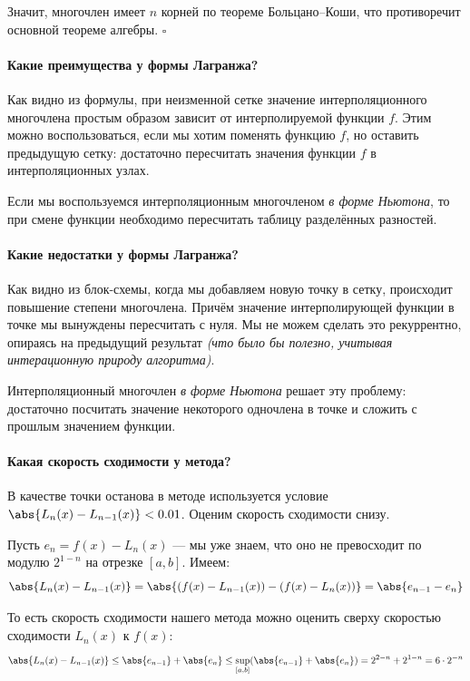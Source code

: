 Значит, многочлен имеет \( n \) корней по теореме Больцано--Коши, что противоречит основной теореме алгебры. \( \square \)

\paragraph{Какие преимущества у формы Лагранжа?}

Как видно из формулы, при неизменной сетке значение интерполяционного многочлена простым образом зависит от интерполируемой функции \( f \). Этим можно воспользоваться, если мы хотим поменять функцию \( f \), но оставить предыдущую сетку: достаточно пересчитать значения функции \( f \) в интерполяционных узлах.

Если мы воспользуемся интерполяционным многочленом \textit{в форме Ньютона}, то при смене функции необходимо пересчитать таблицу разделённых разностей.

\paragraph{Какие недостатки у формы Лагранжа?}

Как видно из блок-схемы, когда мы добавляем новую точку в сетку, происходит повышение степени многочлена. Причём значение интерполирующей функции в точке мы вынуждены пересчитать с нуля. Мы не можем сделать это рекуррентно, опираясь на предыдущий результат \textit{(что было бы полезно, учитывая интерационную природу алгоритма)}. 

Интерполяционный многочлен \textit{в форме Ньютона} решает эту проблему: достаточно посчитать значение некоторого одночлена в точке и сложить с прошлым значением функции.

\paragraph{Какая скорость сходимости у метода?}

В качестве точки останова в методе используется условие \( \abs{L_n(x)-L_{n-1}(x)}< 0.01 \). Оценим скорость сходимости снизу.

Пусть \( e_n=f(x)-L_n(x) \) --- мы уже знаем, что оно не превосходит по модулю \( 2^{1-n} \) на отрезке \( [a,b] \). Имеем:
\[
  \abs{L_n(x)-L_{n-1}(x)}=\abs{(f(x)-L_{n-1}(x))-(f(x)-L_n(x))}=\abs{e_{n-1}-e_n}
\]

То есть скорость сходимости нашего метода можно оценить сверху скоростью сходимости \( L_n(x) \) к \( f(x) \):
\[
  \abs{L_n(x)-L_{n-1}(x)}\leq\abs{e_{n-1}}+\abs{e_n}\leq\sup_{[a,b]}(\abs{e_{n-1}}+\abs{e_n})=2^{2-n}+2^{1-n}=6\cdot 2^{-n}
\]

